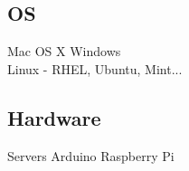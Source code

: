 \documentclass[]{deedy-resume}
\begin{document}
\begin{minipage}[t]{0.33\textwidth}
\subsection{OS}
Mac OS X \textbullet{}
Windows \\
Linux - RHEL, Ubuntu, Mint... \\

\subsection{Hardware}
Servers \textbullet{}
Arduino \textbullet{}
Raspberry Pi \\


%
%

\end{minipage} 
\hfill
\end{document}
